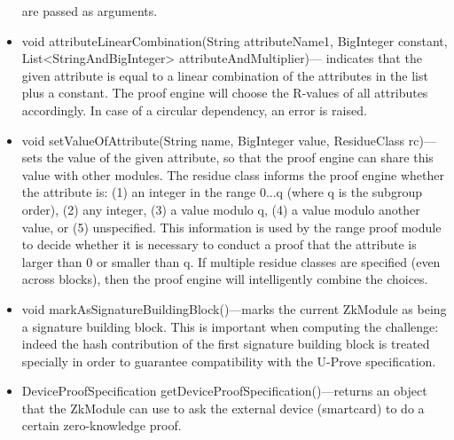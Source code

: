 \begin{method}
\begin{itemize}
        are passed as arguments.
      \item void attributeLinearCombination(String attributeName1, BigInteger constant, List<StringAndBigInteger> attributeAndMultiplier)---
        indicates that the given attribute is equal to a linear combination of the attributes in the list plus a constant.
        The proof engine will choose the R-values of all attributes accordingly. In case of a circular dependency,
        an error is raised.
      \item void setValueOfAttribute(String name, BigInteger value, ResidueClass rc)---sets the value of the given attribute, so that the
        proof engine can share this value with other modules. The residue class informs the proof engine
        whether the attribute is: (1) an integer in the range 0...q (where q is the subgroup order),
        (2) any integer, (3) a value modulo q, (4) a value modulo another value, or (5) unspecified.
        This information is used by the range proof module to decide whether it is necessary
        to conduct a proof that the attribute is larger than 0 or smaller than q.
        If multiple residue classes are specified (even across blocks), then the
        proof engine will intelligently combine the choices.
      \item void markAsSignatureBuildingBlock()---marks the current ZkModule as being a signature
      building block. This is important when computing the challenge: indeed the hash
      contribution of the first signature
      building block is treated specially in order to guarantee compatibility with the U-Prove
      specification.
      \item DeviceProofSpecification getDeviceProofSpecification()---returns an object that
      the ZkModule can use to ask the external device (smartcard) to do a certain zero-knowledge proof.
      \end{itemize}
    \end{method}
